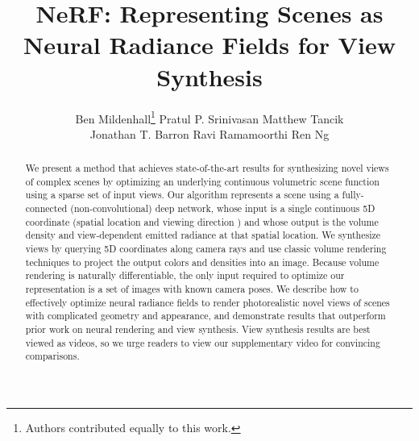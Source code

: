\documentclass[runningheads]{llncs}
\makeatletter
\newcommand{\printfnsymbol}[1]{\textsuperscript{\@fnsymbol{#1}}}
\makeatother
\begin{document}
\pagestyle{headings}
\mainmatter
\def\ECCVSubNumber{1473}  

\title{NeRF: Representing Scenes as \\ Neural Radiance Fields for View Synthesis} 





\author{Ben Mildenhall\thanks{Authors contributed equally to this work.}
\quad
Pratul P. Srinivasan\printfnsymbol{1}
\quad
Matthew Tancik\printfnsymbol{1} \\
Jonathan T. Barron
\quad
Ravi Ramamoorthi
\quad
Ren Ng 
}

\maketitle

\begin{abstract}

We present a method that achieves state-of-the-art results for synthesizing novel views of complex scenes by optimizing an underlying continuous volumetric scene function using a sparse set of input views. Our algorithm represents a scene using a fully-connected (non-convolutional) deep network, whose input is a single continuous 5D coordinate (spatial location  and viewing direction ) and whose output is the volume density and view-dependent emitted radiance at that spatial location. We synthesize views by querying 5D coordinates along camera rays and use classic volume rendering techniques to project the output colors and densities into an image. Because volume rendering is naturally differentiable, the only input required to optimize our representation is a set of images with known camera poses. We describe how to effectively optimize neural radiance fields to render photorealistic novel views of scenes with complicated geometry and appearance, and demonstrate results that outperform prior work on neural rendering and view synthesis. View synthesis results are best viewed as videos, so we urge readers to view our supplementary video for convincing comparisons. 

\end{abstract}
\end{document}
